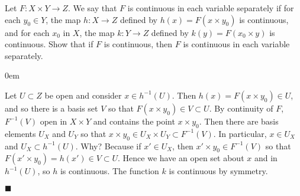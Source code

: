 \documentclass[12pt]{article}
\renewcommand{\qed}{\hfill$\blacksquare$}
\renewenvironment{proof}{\begin{addmargin}[1em]{0em}\begin{newproof}}{\end{newproof}\end{addmargin}\qed}
\newenvironment{problem}[2][Exercise]{\begin{trivlist}
\item[\hskip \labelsep {\bfseries #1}\hskip \labelsep {\bfseries #2.}]}{\end{trivlist}}
\begin{document}
\begin{problem}{18.11}
	Let $F:X\times Y \rightarrow Z$. We say that $F$ is continuous in each variable separately if for each $y_0 \in Y$, the map $h:X\rightarrow Z$ defined by $h\left(x\right) = F\left(x\times y_0\right)$ is continuous, and for each $x_0$ in $X$, the map $k:Y\rightarrow Z$ defined by $k\left(y\right) = F\left(x_0 \times y\right)$ is continuous. Show that if $F$ is continuous, then $F$ is continuous in each variable separately.
\end{problem}
\begin{proof}
	Let $U \subset Z$ be open and consider $x \in h^{-1}\left(U\right)$. Then $h\left(x\right) = F\left(x\times y_0\right) \in U$, and so there is a basis set $V$ so that $F\left(x\times y_0\right) \in V \subset U$. By continuity of $F$, $F^{-1}\left(V\right)$ open in $X\times Y$ and contains the point $x\times y_0$. Then there are basis elements $U_X$ and $U_Y$ so that $x\times y_0 \in U_X \times U_Y \subset F^{-1}\left(V\right)$. In particular, $x \in U_X$ and $U_X \subset h^{-1}\left(U\right)$. Why? Because if $x' \in U_X$, then $x' \times y_0 \in F^{-1}\left(V\right)$ so that $F\left(x' \times y_0\right) = h\left(x'\right) \in V \subset U$. Hence we have an open set about $x$ and in $h^{-1}\left(U\right)$, so $h$ is continuous. The function $k$ is continuous by symmetry.
\end{proof}
\end{document}
